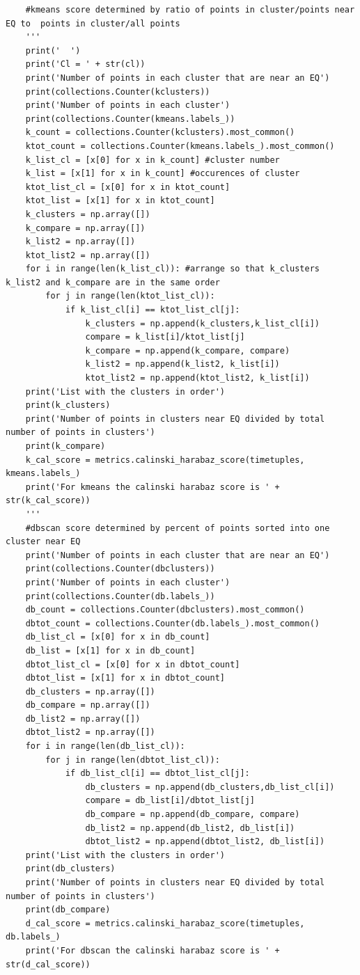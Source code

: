 \documentclass[colorlinks=true,pdfstartview=FitV,linkcolor=blue,
            citecolor=red,urlcolor=magenta]{ligodoc}
\begin{document}
\begin{verbatim}
    #kmeans score determined by ratio of points in cluster/points near EQ to  points in cluster/all points
    '''
    print('  ')
    print('Cl = ' + str(cl))
    print('Number of points in each cluster that are near an EQ')
    print(collections.Counter(kclusters))
    print('Number of points in each cluster')
    print(collections.Counter(kmeans.labels_))
    k_count = collections.Counter(kclusters).most_common()
    ktot_count = collections.Counter(kmeans.labels_).most_common()
    k_list_cl = [x[0] for x in k_count] #cluster number
    k_list = [x[1] for x in k_count] #occurences of cluster
    ktot_list_cl = [x[0] for x in ktot_count]
    ktot_list = [x[1] for x in ktot_count]
    k_clusters = np.array([])
    k_compare = np.array([])
    k_list2 = np.array([])
    ktot_list2 = np.array([])
    for i in range(len(k_list_cl)): #arrange so that k_clusters k_list2 and k_compare are in the same order
        for j in range(len(ktot_list_cl)):
            if k_list_cl[i] == ktot_list_cl[j]:
                k_clusters = np.append(k_clusters,k_list_cl[i])
                compare = k_list[i]/ktot_list[j]
                k_compare = np.append(k_compare, compare)
                k_list2 = np.append(k_list2, k_list[i])
                ktot_list2 = np.append(ktot_list2, k_list[i])
    print('List with the clusters in order')
    print(k_clusters)
    print('Number of points in clusters near EQ divided by total number of points in clusters')
    print(k_compare)
    k_cal_score = metrics.calinski_harabaz_score(timetuples, kmeans.labels_)
    print('For kmeans the calinski harabaz score is ' + str(k_cal_score))
    '''
    #dbscan score determined by percent of points sorted into one cluster near EQ
    print('Number of points in each cluster that are near an EQ')
    print(collections.Counter(dbclusters))
    print('Number of points in each cluster')
    print(collections.Counter(db.labels_))
    db_count = collections.Counter(dbclusters).most_common()
    dbtot_count = collections.Counter(db.labels_).most_common()
    db_list_cl = [x[0] for x in db_count]
    db_list = [x[1] for x in db_count]
    dbtot_list_cl = [x[0] for x in dbtot_count]
    dbtot_list = [x[1] for x in dbtot_count]
    db_clusters = np.array([])
    db_compare = np.array([])
    db_list2 = np.array([])
    dbtot_list2 = np.array([])
    for i in range(len(db_list_cl)):
        for j in range(len(dbtot_list_cl)):
            if db_list_cl[i] == dbtot_list_cl[j]:
                db_clusters = np.append(db_clusters,db_list_cl[i])
                compare = db_list[i]/dbtot_list[j]
                db_compare = np.append(db_compare, compare)
                db_list2 = np.append(db_list2, db_list[i])
                dbtot_list2 = np.append(dbtot_list2, db_list[i])
    print('List with the clusters in order')
    print(db_clusters)
    print('Number of points in clusters near EQ divided by total number of points in clusters')
    print(db_compare)
    d_cal_score = metrics.calinski_harabaz_score(timetuples, db.labels_)
    print('For dbscan the calinski harabaz score is ' + str(d_cal_score))


\end{verbatim}
\end{document}
